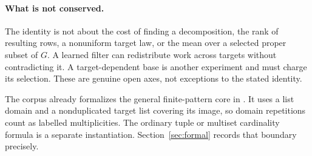 \paragraph{What is not conserved.}
The identity is not about the cost of finding a decomposition, the rank
of resulting rows, a nonuniform target law, or the mean over a selected
proper subset of $G$. A learned filter can redistribute work across
targets without contradicting it. A target-dependent base is another
experiment and must charge its selection. These are genuine open axes,
not exceptions to the stated identity.

The corpus already formalizes the general finite-pattern core in
. It uses a list domain and a
nonduplicated target list covering its image, so domain repetitions
count as labelled multiplicities. The ordinary tuple or multiset
cardinality formula is a separate instantiation. Section~\ref{sec:formal}
records that boundary precisely.
